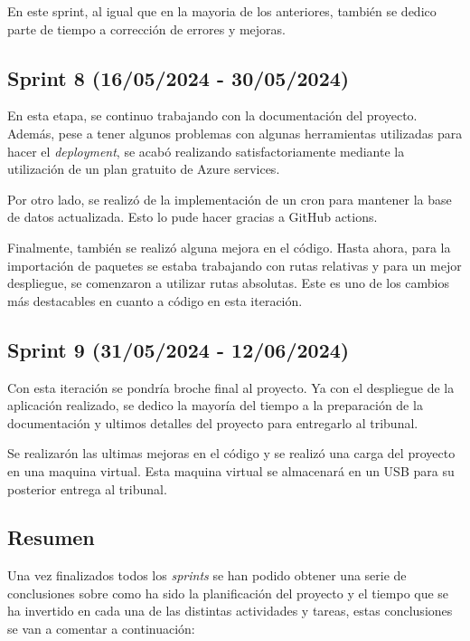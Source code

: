 En este sprint, al igual que en la mayoria de los anteriores, también se dedico parte de tiempo a corrección de errores y mejoras.


\subsection{Sprint 8 (16/05/2024 -
30/05/2024)}
En esta etapa, se continuo trabajando con la documentación del proyecto. Además, pese a tener algunos problemas con algunas herramientas utilizadas para hacer el \textit{deployment}, se acabó realizando satisfactoriamente mediante la utilización de un plan gratuito de Azure services. 

Por otro lado, se realizó de la implementación de un cron para mantener la base de datos actualizada. Esto lo pude hacer gracias a GitHub actions.

Finalmente, también se realizó alguna mejora en el código. Hasta ahora, para la importación de paquetes se estaba trabajando con rutas relativas y para un mejor despliegue, se comenzaron a utilizar rutas absolutas. Este es uno de los cambios más destacables en cuanto a código en esta iteración.

\subsection{Sprint 9 (31/05/2024 -
12/06/2024)}
Con esta iteración se pondría broche final al proyecto. Ya con el despliegue de la aplicación realizado, se dedico la mayoría del tiempo a la preparación de la documentación y ultimos detalles del proyecto para entregarlo al tribunal.

Se realizarón las ultimas mejoras en el código y se realizó una carga del proyecto en una maquina virtual. Esta maquina virtual se almacenará en un USB para su posterior entrega al tribunal.



\subsection{Resumen}

Una vez finalizados todos los \textit{sprints} se han podido obtener una serie de conclusiones sobre como ha sido la planificación del proyecto y el tiempo que se ha invertido en cada una de las distintas actividades y tareas, estas conclusiones se van a comentar a continuación:

